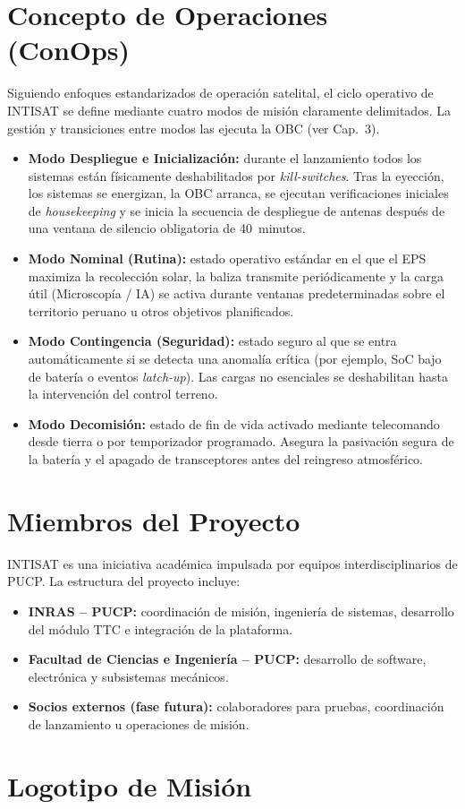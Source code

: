 \section{Concepto de Operaciones (ConOps)}
Siguiendo enfoques estandarizados de operación satelital, el ciclo operativo de INTISAT se define mediante cuatro modos de misión claramente delimitados. La gestión y transiciones entre modos las ejecuta la OBC (ver Cap.~3).

\begin{itemize}
    \item \textbf{Modo Despliegue e Inicialización:} durante el lanzamiento todos los sistemas están físicamente deshabilitados por \textit{kill-switches}. Tras la eyección, los sistemas se energizan, la OBC arranca, se ejecutan verificaciones iniciales de \textit{housekeeping} y se inicia la secuencia de despliegue de antenas después de una ventana de silencio obligatoria de 40~minutos.

    \item \textbf{Modo Nominal (Rutina):} estado operativo estándar en el que el EPS maximiza la recolección solar, la baliza transmite periódicamente y la carga útil (Microscopía / IA) se activa durante ventanas predeterminadas sobre el territorio peruano u otros objetivos planificados.

    \item \textbf{Modo Contingencia (Seguridad):} estado seguro al que se entra automáticamente si se detecta una anomalía crítica (por ejemplo, SoC bajo de batería o eventos \textit{latch-up}). Las cargas no esenciales se deshabilitan hasta la intervención del control terreno.

    \item \textbf{Modo Decomisión:} estado de fin de vida activado mediante telecomando desde tierra o por temporizador programado. Asegura la pasivación segura de la batería y el apagado de transceptores antes del reingreso atmosférico.
\end{itemize}

\section{Miembros del Proyecto}
INTISAT es una iniciativa académica impulsada por equipos interdisciplinarios de PUCP. La estructura del proyecto incluye:
\begin{itemize}
    \item \textbf{INRAS – PUCP:} coordinación de misión, ingeniería de sistemas, desarrollo del módulo TTC e integración de la plataforma.
    \item \textbf{Facultad de Ciencias e Ingeniería – PUCP:} desarrollo de software, electrónica y subsistemas mecánicos.
    \item \textbf{Socios externos (fase futura):} colaboradores para pruebas, coordinación de lanzamiento u operaciones de misión.
\end{itemize}

\section{Logotipo de Misión}
